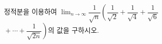 정적분을 이용하여 $\displaystyle\lim_{n\to\infty}\dfrac{1}{\sqrt{n}}\left(\dfrac{1}{\sqrt{2}}+\dfrac{1}{\sqrt{4}}+\dfrac{1}{\sqrt{6}}\right.$\\ \mbox{}\qquad $\left.{}+\cdots+\dfrac{1}{\sqrt{2n}}\right)$의 값을 구하시오.
